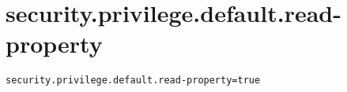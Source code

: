 \section{security.privilege.default.read-property}
\label{configuration:SecurityPrivilegeDefaultReadProperty}
\AvailableInJavaOnly{\TODO}
\begin{lstlisting}[style=Props,caption={Usage example for \textit{security.privilege.default.read-property}}]
security.privilege.default.read-property=true
\end{lstlisting}